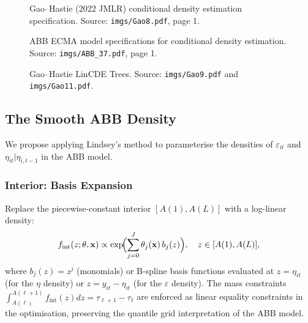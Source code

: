 \documentclass[12pt]{article}
\begin{document}
\begin{figure}[H]
\centering
\caption{Gao--Hastie (2022 JMLR) conditional density estimation specification.
Source: \texttt{imgs/Gao8.pdf}, page 1.}
\label{fig:gao2}
\end{figure}

\begin{figure}[H]
\centering
\caption{ABB ECMA model specifications for conditional density estimation.
Source: \texttt{imgs/ABB\_37.pdf}, page 1.}
\label{fig:gao3}
\end{figure}

\begin{figure}[H]
\centering
\caption{Gao--Hastie LinCDE Trees.
Source: \texttt{imgs/Gao9.pdf} and \texttt{imgs/Gao11.pdf}.}
\label{fig:gao4}
\end{figure}

\subsection{The Smooth ABB Density}

We propose applying Lindsey's method to parameterise the densities of
$\varepsilon_{it}$ and $\eta_{it}|\eta_{i,t-1}$ in the ABB model.

\subsubsection*{Interior: Basis Expansion}

Replace the piecewise-constant interior $[A(1),A(L)]$ with a log-linear
density:
\begin{equation}\label{eq:smooth_int}
f_{\text{int}}(z;\theta,\mathbf{x})
\propto\exp\!\Bigl(\sum_{j=0}^J\theta_j(\mathbf{x})\,b_j(z)\Bigr),
\quad z\in[A(1),A(L)],
\end{equation}
where $b_j(z)=z^j$ (monomials) or B-spline basis functions evaluated at
$z=\eta_{it}$ (for the $\eta$ density) or $z=y_{it}-\eta_{it}$ (for the
$\varepsilon$ density).
The mass constraints $\int_{A(\ell)}^{A(\ell+1)}f_{\text{int}}(z)dz=\tau_{\ell+1}-\tau_\ell$
are enforced as linear equality constraints in the optimisation, preserving the
quantile grid interpretation of the ABB model.
\end{document}
